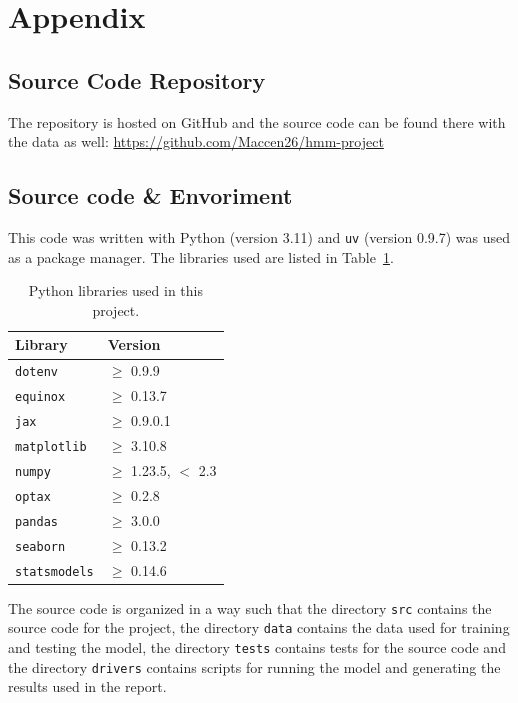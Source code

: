 \section{Appendix}

\subsection{Source Code Repository} \label{section:app:repo}
The repository is hosted on GitHub and the source code can be found there with the data as well:
\url{https://github.com/Maccen26/hmm-project}

\subsection{Source code \& Envoriment} \label{section:app:env}
This code was written with Python (version 3.11) and \texttt{uv} (version 0.9.7) \citep{astral_uv_docs} was used as a package manager.
The libraries used are listed in Table~\ref{tab:libraries}.

\begin{table}[H]
    \centering
    \begin{tabular}{ll}
        \toprule
        \textbf{Library} & \textbf{Version} \\
        \midrule
        \texttt{dotenv}      & $\geq$ 0.9.9 \\
        \texttt{equinox}     & $\geq$ 0.13.7 \\
        \texttt{jax}         & $\geq$ 0.9.0.1 \\
        \texttt{matplotlib}  & $\geq$ 3.10.8 \\
        \texttt{numpy}       & $\geq$ 1.23.5, $<$ 2.3 \\
        \texttt{optax}       & $\geq$ 0.2.8 \\
        \texttt{pandas}      & $\geq$ 3.0.0 \\
        \texttt{seaborn}     & $\geq$ 0.13.2 \\
        \texttt{statsmodels} & $\geq$ 0.14.6 \\
        \bottomrule
    \end{tabular}
    \caption{Python libraries used in this project.}
    \label{tab:libraries}
\end{table}

The source code is organized in a way such that the directory \texttt{src} contains the source code for the project,
the directory \texttt{data} contains the data used for training and testing the model,
the directory \texttt{tests} contains tests for the source code and
the directory \texttt{drivers} contains scripts for running the model and generating the results used in the report.

